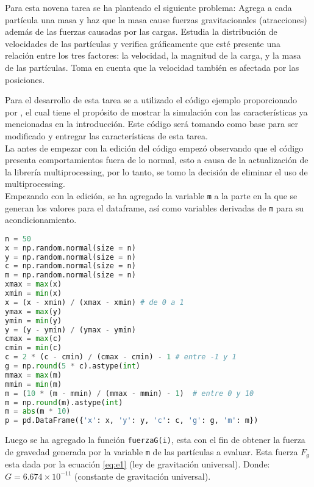 \documentclass{article}
\begin{document}
Para esta novena tarea se ha planteado el siguiente problema: Agrega a cada partícula una masa y haz que la masa cause fuerzas gravitacionales (atracciones) además de las fuerzas causadas por las cargas. Estudia la distribución de velocidades de las partículas y verifica gráficamente que esté presente una relación entre los tres factores: la velocidad, la magnitud de la carga, y la masa de las partículas. Toma en cuenta que la velocidad también es afectada por las posiciones.

Para el desarrollo de esta tarea se a utilizado el código ejemplo proporcionado por \citet{DRA.Code}, el cual tiene el propósito de mostrar la simulación con las características ya mencionadas en la introducción. 
Este código será tomando como base para ser modificado y entregar las características de esta tarea.\\

La antes de empezar con la edición del código empezó observando que el código \citep{DRA.Code} presenta comportamientos fuera de lo normal, esto a causa de la actualización de la librería multiprocessing, por lo tanto, se tomo la decisión de eliminar el uso de multiprocessing.\\

Empezando con la edición, se ha agregado la variable \texttt{m} a la parte en la que se generan los valores para el dataframe, así como variables derivadas de \texttt{m} para su acondicionamiento.



\begin{lstlisting}[language=Python]
n = 50
x = np.random.normal(size = n)
y = np.random.normal(size = n)
c = np.random.normal(size = n)
m = np.random.normal(size = n)
xmax = max(x)
xmin = min(x)
x = (x - xmin) / (xmax - xmin) # de 0 a 1
ymax = max(y)
ymin = min(y)
y = (y - ymin) / (ymax - ymin)
cmax = max(c)
cmin = min(c)
c = 2 * (c - cmin) / (cmax - cmin) - 1 # entre -1 y 1
g = np.round(5 * c).astype(int)
mmax = max(m)
mmin = min(m)
m = (10 * (m - mmin) / (mmax - mmin) - 1)  # entre 0 y 10
m = np.round(m).astype(int)
m = abs(m * 10)
p = pd.DataFrame({'x': x, 'y': y, 'c': c, 'g': g, 'm': m})
 \end{lstlisting}
 
 Luego se ha agregado la función  \texttt{fuerzaG(i)}, esta con el fin de obtener la fuerza de gravedad generada por la variable \texttt{m} de las partículas a evaluar. Esta fuerza $F_g$ esta dada por la ecuación \ref{eq:e1} (ley de gravitación universal). Donde: $G= 6.674\times10^{-11}$ (constante de gravitación universal).
 
\end{document}
